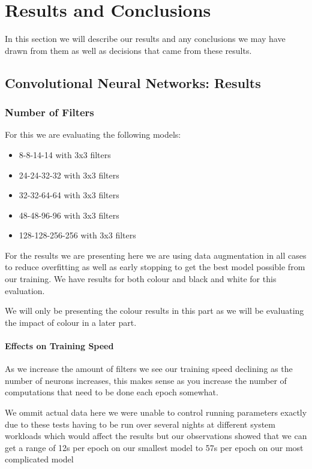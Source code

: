 \chapter{Results and Conclusions}
In this section we will describe our results and any conclusions we may have drawn from them as well as decisions that came from these results.
\section{Convolutional Neural Networks: Results}
\subsection{Number of Filters}
For this we are evaluating the following models:
\begin{itemize}
	\item 8-8-14-14 with 3x3 filters
	\item 24-24-32-32 with 3x3 filters
	\item 32-32-64-64 with 3x3 filters
	\item 48-48-96-96 with 3x3 filters
	\item 128-128-256-256 with 3x3 filters
\end{itemize}
For the results we are presenting here we are using data augmentation in all cases to reduce overfitting as well as early stopping to get the best model possible from our training. We have results for both colour and black and white for this evaluation.

We will only be presenting the colour results in this part as we will be evaluating the impact of colour in a later part.

\subsubsection{Effects on Training Speed}
As we increase the amount of filters we see our training speed declining as the number of neurons increases, this makes sense as you increase the number of computations that need to be done each epoch somewhat.

We ommit actual data here we were unable to control running parameters exactly due to these tests having to be run over several nights at different system workloads which would affect the results but our observations showed that we can get a range of 12s per epoch on our smallest model to 57s per epoch on our most complicated model
